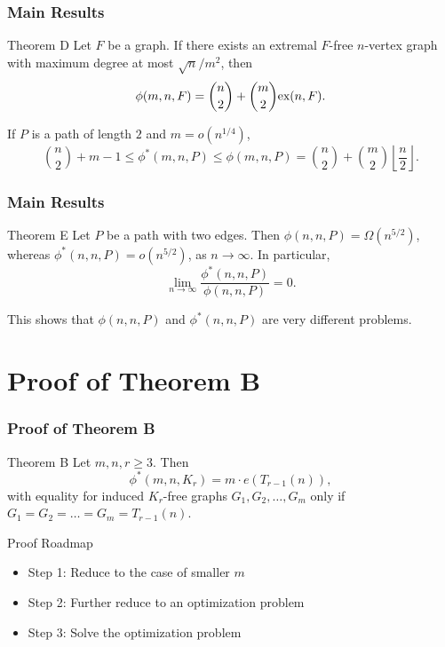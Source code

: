\documentclass{beamer}
\newcommand*{\ex}{\textnormal{ex}}
\begin{document}
\begin{frame}
  \frametitle{Main Results}

  \begin{block}{Theorem D}
    Let $F$ be a graph. If there exists an extremal $F$-free $n$-vertex graph with maximum degree at most $\sqrt{n}/m^2$, then 
    \[ 
      \phi(m, n, F) = \binom{n}{2} + \binom{m}{2}\ex(n,F).
    \]
  \end{block}

  \pause

  \vspace{0.3cm}

  If $P$ is a path of length $2$ and $m = o(n^{1/4})$, 
  \[
    \binom{n}{2} + m - 1 \leq \phi^*(m, n, P) \leq \phi(m, n, P) = \binom{n}{2} + \binom{m}{2} \left\lfloor \frac{n}{2}\right\rfloor. 
  \]
\end{frame}

\begin{frame}
  \frametitle{Main Results}

  \begin{block}{Theorem E}
    Let $P$ be a path with two edges. Then $\phi(n, n, P) = \Omega(n^{5/2})$, whereas $\phi^*(n, n, P) = o(n^{5/2})$, as $n \rightarrow \infty$. In particular, 
    \[ 
      \lim_{n \rightarrow \infty} \frac{\phi^*(n, n, P)}{\phi(n, n, P)} = 0.
    \]
  \end{block}

  \pause

  \vspace{0.3cm}

  This shows that $\phi(n, n, P)$ and $\phi^*(n, n, P)$ are very different problems.
\end{frame}

\section{Proof of Theorem B}

\begin{frame}
  \frametitle{Proof of Theorem B}

  \begin{block}{Theorem B}
    Let $m, n, r \geq 3$. Then 
    \[
      \phi^*(m,n,K_{r}) = m \cdot e(T_{r - 1}(n)),
    \]
    with equality for induced $K_{r}$-free graphs $G_1, G_2, \dots, G_m$ only if $G_1 = G_2 = \dots = G_m = T_{r - 1}(n)$.  
  \end{block}

  \vspace{0.3cm}

  Proof Roadmap

  \begin{itemize}
    \item Step 1: Reduce to the case of smaller $m$
    \item Step 2: Further reduce to an optimization problem
    \item Step 3: Solve the optimization problem
  \end{itemize}
\end{frame}
\end{document}
